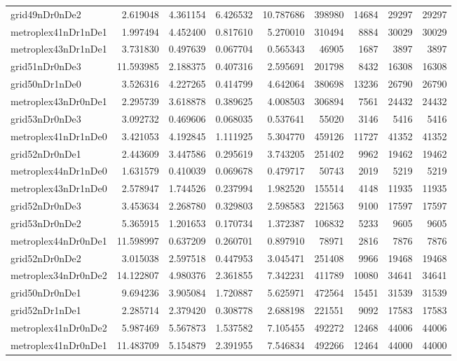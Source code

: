 \begin{longtable}{|l|r|r|r|r|r|r|r|r|}
grid49nDr0nDe2 & 2.619048 & 4.361154 & 6.426532 & 10.787686 & 398980 & 14684 & 29297 & 29297 \\
metroplex41nDr1nDe1 & 1.997494 & 4.452400 & 0.817610 & 5.270010 & 310494 & 8884 & 30029 & 30029 \\
metroplex43nDr1nDe1 & 3.731830 & 0.497639 & 0.067704 & 0.565343 & 46905 & 1687 & 3897 & 3897 \\
grid51nDr0nDe3 & 11.593985 & 2.188375 & 0.407316 & 2.595691 & 201798 & 8432 & 16308 & 16308 \\
grid50nDr1nDe0 & 3.526316 & 4.227265 & 0.414799 & 4.642064 & 380698 & 13236 & 26790 & 26790 \\
metroplex43nDr0nDe1 & 2.295739 & 3.618878 & 0.389625 & 4.008503 & 306894 & 7561 & 24432 & 24432 \\
grid53nDr0nDe3 & 3.092732 & 0.469606 & 0.068035 & 0.537641 & 55020 & 3146 & 5416 & 5416 \\
metroplex41nDr1nDe0 & 3.421053 & 4.192845 & 1.111925 & 5.304770 & 459126 & 11727 & 41352 & 41352 \\
grid52nDr0nDe1 & 2.443609 & 3.447586 & 0.295619 & 3.743205 & 251402 & 9962 & 19462 & 19462 \\
metroplex44nDr1nDe0 & 1.631579 & 0.410039 & 0.069678 & 0.479717 & 50743 & 2019 & 5219 & 5219 \\
metroplex43nDr1nDe0 & 2.578947 & 1.744526 & 0.237994 & 1.982520 & 155514 & 4148 & 11935 & 11935 \\
grid52nDr0nDe3 & 3.453634 & 2.268780 & 0.329803 & 2.598583 & 221563 & 9100 & 17597 & 17597 \\
grid53nDr0nDe2 & 5.365915 & 1.201653 & 0.170734 & 1.372387 & 106832 & 5233 & 9605 & 9605 \\
metroplex44nDr0nDe1 & 11.598997 & 0.637209 & 0.260701 & 0.897910 & 78971 & 2816 & 7876 & 7876 \\
grid52nDr0nDe2 & 3.015038 & 2.597518 & 0.447953 & 3.045471 & 251408 & 9966 & 19468 & 19468 \\
metroplex34nDr0nDe2 & 14.122807 & 4.980376 & 2.361855 & 7.342231 & 411789 & 10080 & 34641 & 34641 \\
grid50nDr0nDe1 & 9.694236 & 3.905084 & 1.720887 & 5.625971 & 472564 & 15451 & 31539 & 31539 \\
grid52nDr1nDe1 & 2.285714 & 2.379420 & 0.308778 & 2.688198 & 221551 & 9092 & 17583 & 17583 \\
metroplex41nDr0nDe2 & 5.987469 & 5.567873 & 1.537582 & 7.105455 & 492272 & 12468 & 44006 & 44006 \\
metroplex41nDr0nDe1 & 11.483709 & 5.154879 & 2.391955 & 7.546834 & 492266 & 12464 & 44000 & 44000 \\

\end{longtable}
